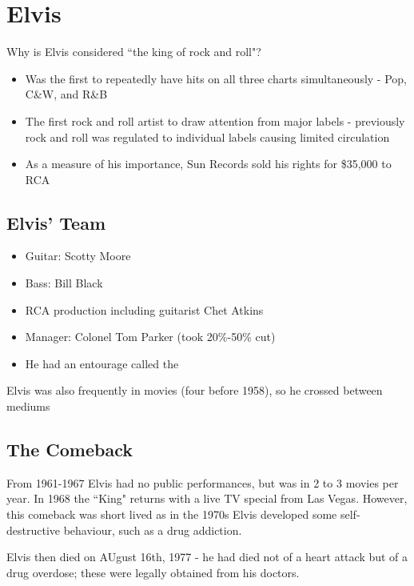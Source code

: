\documentclass[12pt, a4paper, twoside, openright, titlepage]{book}
\begin{document}
\section{Elvis}

\begin{qst}{}{}
    Why is Elvis considered ``the king of rock and roll"?
\end{qst}
\begin{itemize}
    \item Was the first to repeatedly have hits on all three charts simultaneously - Pop, C\&W, and R\&B
    \item The first rock and roll artist to draw attention from major labels - previously rock and roll was regulated to individual labels causing limited circulation
    \item As a measure of his importance, Sun Records sold his rights for \$35,000 to RCA
\end{itemize}

\subsection{Elvis' Team}

\begin{itemize}
    \item Guitar: Scotty Moore
    \item Bass: Bill Black
    \item RCA production including guitarist Chet Atkins
    \item Manager: Colonel Tom Parker (took 20\%-50\% cut)
    \item He had an entourage called the 
\end{itemize}

Elvis was also frequently in movies (four before 1958), so he crossed between mediums

\subsection{The Comeback}

From 1961-1967 Elvis had no public performances, but was in 2 to 3 movies per year. In 1968 the ``King" returns with a live TV special from Las Vegas. However, this comeback was short lived as in the 1970s Elvis developed some self-destructive behaviour, such as a drug addiction.

Elvis then died on AUgust 16th, 1977 - he had died not of a heart attack but of a drug overdose; these were legally obtained from his doctors.
\end{document}
